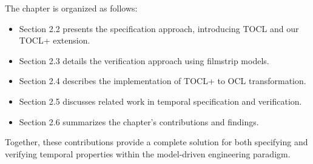 The chapter is organized as follows:
\begin{itemize}
    \item Section 2.2 presents the specification approach, introducing TOCL and our TOCL+ extension.
    
    \item Section 2.3 details the verification approach using filmstrip models.
    
    \item Section 2.4 describes the implementation of TOCL+ to OCL transformation.
    
    \item Section 2.5 discusses related work in temporal specification and verification.
    
    \item Section 2.6 summarizes the chapter's contributions and findings.
\end{itemize}

Together, these contributions provide a complete solution for both specifying and 
verifying temporal properties within the model-driven engineering paradigm.